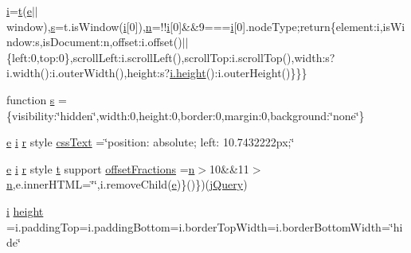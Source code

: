 \begin{DoxyCompactItemize}
\hyperlink{jquery-ui_8min_8js_a83e0f8a79d7f496783fc7527db51773e}{i}=\hyperlink{jquery-ui_8min_8js_acf335ef347969ef6dc8387e680fb289e}{t}(\hyperlink{jquery-ui_8min_8js_abea95a4e94bc6f4151d5683d4c12c3f4}{e}$\vert$$\vert$window),\hyperlink{paste_2plugin_8min_8js_a43ae144ee2a4e493fea41ca42f795b14}{s}=t.\+is\+Window(\hyperlink{jquery-ui_8min_8js_a83e0f8a79d7f496783fc7527db51773e}{i}\mbox{[}0\mbox{]}),\hyperlink{fullpage_2plugin_8min_8js_ab767a859d1217315f42c9bb52fc648dc}{n}=!!\hyperlink{jquery-ui_8min_8js_a83e0f8a79d7f496783fc7527db51773e}{i}\mbox{[}0\mbox{]}\&\&9===\hyperlink{jquery-ui_8min_8js_a83e0f8a79d7f496783fc7527db51773e}{i}\mbox{[}0\mbox{]}.node\+Type;return\{element\+:i,is\+Window\+:s,is\+Document\+:n,offset\+:i.\+offset()$\vert$$\vert$\{left\+:0,top\+:0\},scroll\+Left\+:i.\+scroll\+Left(),scroll\+Top\+:i.\+scroll\+Top(),width\+:s?i.\+width()\+:i.\+outer\+Width(),height\+:s?\hyperlink{jquery-ui_8min_8js_a7ec7f4e8243c6c20295ecc9a90225d43}{i.\+height}()\+:i.\+outer\+Height()\}\}\}
\item 
function \hyperlink{jquery-ui_8min_8js_a387623556fbc0ba947c5babd49e10aaa}{s} =\{visibility\+:\char`\"{}hidden\char`\"{},width\+:0,height\+:0,border\+:0,margin\+:0,background\+:\char`\"{}none\char`\"{}\}
\item 
\hyperlink{jquery-ui_8min_8js_abea95a4e94bc6f4151d5683d4c12c3f4}{e} \hyperlink{jquery-ui_8min_8js_a83e0f8a79d7f496783fc7527db51773e}{i} \hyperlink{jquery-1_811_81_8min_8js_a96f65b399314d93896076ceb474b6b9b}{r} style \hyperlink{jquery-ui_8min_8js_a1aa5823ddc65573329cac2fa14dc4e5d}{css\+Text} =\char`\"{}position\+: absolute; left\+: 10.\+7432222px;\char`\"{}
\item 
\hyperlink{jquery-ui_8min_8js_abea95a4e94bc6f4151d5683d4c12c3f4}{e} \hyperlink{jquery-ui_8min_8js_a83e0f8a79d7f496783fc7527db51773e}{i} \hyperlink{jquery-1_811_81_8min_8js_a96f65b399314d93896076ceb474b6b9b}{r} style \hyperlink{jquery-ui_8min_8js_acf335ef347969ef6dc8387e680fb289e}{t} support \hyperlink{jquery-ui_8min_8js_a594b772a0e6cd1258328ad4fa6e62424}{offset\+Fractions} =\hyperlink{fullpage_2plugin_8min_8js_ab767a859d1217315f42c9bb52fc648dc}{n}$>$10\&\&11$>$\hyperlink{fullpage_2plugin_8min_8js_ab767a859d1217315f42c9bb52fc648dc}{n},e.\+inner\+H\+T\+ML=\char`\"{}\char`\"{},i.\+remove\+Child(\hyperlink{jquery-ui_8min_8js_abea95a4e94bc6f4151d5683d4c12c3f4}{e})\}()\})(\hyperlink{jquery_8tokeninput_8js_a2b1d6f9c448e3ce72f4e1865d6e38d2c}{j\+Query})
\item 
\hyperlink{jquery-ui_8min_8js_a83e0f8a79d7f496783fc7527db51773e}{i} \hyperlink{jquery-ui_8min_8js_a7ec7f4e8243c6c20295ecc9a90225d43}{height} =i.\+padding\+Top=i.\+padding\+Bottom=i.\+border\+Top\+Width=i.\+border\+Bottom\+Width=\char`\"{}hide\char`\"{}
$$
\end{DoxyCompactItemize}
